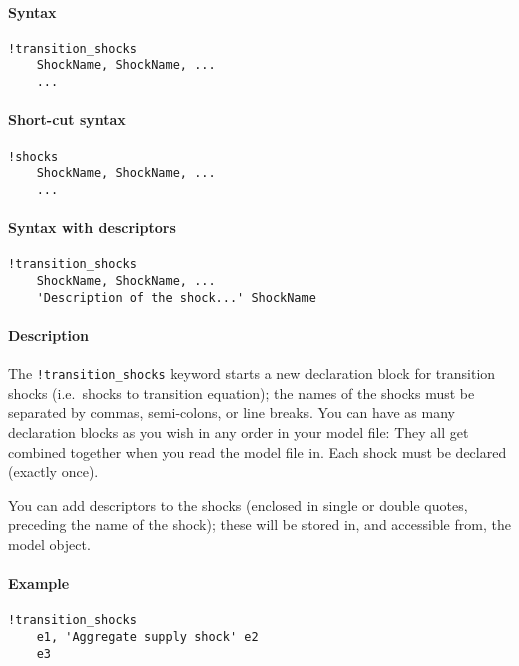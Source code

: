 


	\paragraph{Syntax}

\begin{verbatim}
!transition_shocks
    ShockName, ShockName, ...
    ...
\end{verbatim}

\paragraph{Short-cut syntax}

\begin{verbatim}
!shocks
    ShockName, ShockName, ...
    ...
\end{verbatim}

\paragraph{Syntax with descriptors}

\begin{verbatim}
!transition_shocks
    ShockName, ShockName, ...
    'Description of the shock...' ShockName
\end{verbatim}

\paragraph{Description}

The \texttt{!transition\_shocks} keyword starts a new declaration block
for transition shocks (i.e.~shocks to transition equation); the names of
the shocks must be separated by commas, semi-colons, or line breaks. You
can have as many declaration blocks as you wish in any order in your
model file: They all get combined together when you read the model file
in. Each shock must be declared (exactly once).

You can add descriptors to the shocks (enclosed in single or double
quotes, preceding the name of the shock); these will be stored in, and
accessible from, the model object.

\paragraph{Example}

\begin{verbatim}
!transition_shocks
    e1, 'Aggregate supply shock' e2
    e3
\end{verbatim}


